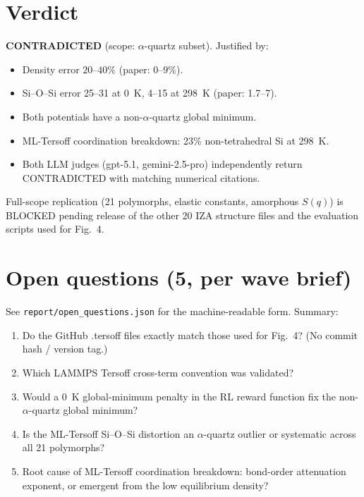 \documentclass[11pt]{article}
\begin{document}
\section{Verdict}
\textbf{CONTRADICTED} (scope: $\alpha$-quartz subset). Justified by:
\begin{itemize}
\item Density error $20$--$40\%$ (paper: $0$--$9\%$).
\item Si--O--Si error 25--31\textdegree{} at 0~K, 4--15\textdegree{} at 298~K (paper: 1.7--7\textdegree{}).
\item Both potentials have a non-$\alpha$-quartz global minimum.
\item ML-Tersoff coordination breakdown: 23\% non-tetrahedral Si at 298~K.
\item Both LLM judges (gpt-5.1, gemini-2.5-pro) independently return CONTRADICTED with matching numerical citations.
\end{itemize}
Full-scope replication (21 polymorphs, elastic constants, amorphous $S(q)$) is BLOCKED pending release of the other 20 IZA structure files and the evaluation scripts used for Fig.\ 4.

\section{Open questions (5, per wave brief)}
See \texttt{report/open\_questions.json} for the machine-readable form. Summary:
\begin{enumerate}
\item Do the GitHub .tersoff files exactly match those used for Fig.\ 4? (No commit hash / version tag.)
\item Which LAMMPS Tersoff cross-term convention was validated?
\item Would a 0~K global-minimum penalty in the RL reward function fix the non-$\alpha$-quartz global minimum?
\item Is the ML-Tersoff Si--O--Si distortion an $\alpha$-quartz outlier or systematic across all 21 polymorphs?
\item Root cause of ML-Tersoff coordination breakdown: bond-order attenuation exponent, or emergent from the low equilibrium density?
\end{enumerate}
\end{document}
